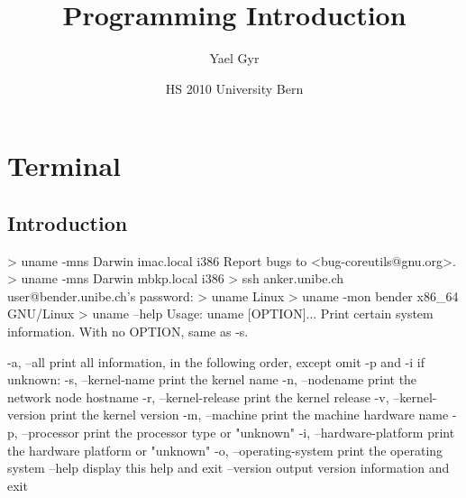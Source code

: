 \documentclass[10pt,a4paper]{scrartcl}
\date{HS 2010 University Bern}
\author{Yael Gyr}
\title{Programming Introduction}
\begin{document}
\maketitle

\tableofcontents

\newpage

\section{Terminal}
\subsection{Introduction}

\begin{terminalcode}
> uname -mns
  Darwin imac.local i386
  Report bugs to <bug-coreutils@gnu.org>.
> uname -mns
  Darwin mbkp.local i386
> ssh anker.unibe.ch
  user@bender.unibe.ch's password: 
> uname
  Linux
> uname -mon
  bender x86_64 GNU/Linux
> uname --help
  Usage: uname [OPTION]...
  Print certain system information.  With no OPTION, same as -s.
  
    -a, --all                print all information, in the following order,
                               except omit -p and -i if unknown:
    -s, --kernel-name        print the kernel name
    -n, --nodename           print the network node hostname
    -r, --kernel-release     print the kernel release
    -v, --kernel-version     print the kernel version
    -m, --machine            print the machine hardware name
    -p, --processor          print the processor type or "unknown"
    -i, --hardware-platform  print the hardware platform or "unknown"
    -o, --operating-system   print the operating system
        --help     display this help and exit
        --version  output version information and exit
\end{terminalcode}
\end{document}
